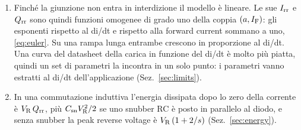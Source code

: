 \documentclass[10pt,a4paper]{scrartcl}
\let\newcommand\lmitdefine
\newcommand{\IF}{I_\mathrm{F}}
\newcommand{\VR}{V_\mathrm{R}}
\newcommand{\Irr}{I_\mathrm{rr}}
\newcommand{\Qrr}{Q_\mathrm{rr}}
\newcommand{\Csn}{C_\mathrm{sn}}
\begin{document}
\begin{enumerate}
\item Finché la giunzione non entra in interdizione il modello è lineare. Le sue $\Irr$ e $\Qrr$ sono quindi funzioni omogenee di grado uno della coppia $(a, \IF)$: gli esponenti rispetto al di/dt e rispetto alla forward current sommano a uno, \eqref{eq:euler}. Su una rampa lunga entrambe crescono in proporzione al di/dt. Una curva del datasheet della carica in funzione del di/dt è molto più piatta, quindi un set di parametri la incontra in un solo punto: i parametri vanno estratti al di/dt dell'applicazione (Sez.~\ref{sec:limits}).
\item In una commutazione induttiva l'energia dissipata dopo lo zero della corrente è $\VR\,\Qrr$, più $\Csn\VR^2/2$ se uno snubber RC è posto in parallelo al diodo, e senza snubber la peak reverse voltage è $\VR\,(1+2/s)$ (Sez.~\ref{sec:energy}).
\end{enumerate}

\end{document}
